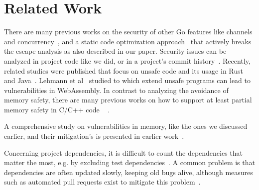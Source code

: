\section{Related Work}
\label{sec:rw}

There are many previous works on the security of other Go features like channels and concurrency~\cite{tu2019,dilley2019,giunti2020,gabet2020,lange2017}, and a static code optimization approach~\cite{wang2020} that  actively breaks the escape analysis as also described in our paper.
Security issues can be analyzed in project code like we did, or in a project's commit history~\cite{zhou2017}.
Recently, related studies were published that focus on unsafe code and its usage in Rust~\cite{qin2020,evans2020} and Java~\cite{mastrangelo2015,huang2019}.
Lehmann et al~\cite{lehmann-everything-2020} studied to which extend unsafe programs can lead to vulnerabilities in WebAssembly. %
In contrast to analyzing the avoidance of memory safety, there are many previous works on how to support at least partial memory safety in C/C++ code ~\cite{burow2018CUP} .

A comprehensive study on vulnerabilities in memory, like the ones we discussed earlier, and their mitigation's is presented in earlier work~\cite{szekeres2013sok}.


Concerning project dependencies, it is difficult to count the dependencies that matter the most, e.g. by excluding test dependencies~\cite{pashchenko2018}.
A common problem is that dependencies are often updated slowly, keeping old bugs alive, although measures such as automated pull requests exist to mitigate this problem~\cite{kula2017, mirhosseini2017}.
